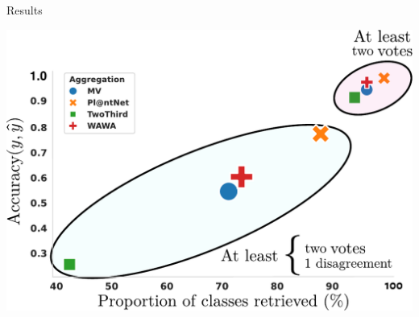 \begin{frame}{Results}{}
    \centering
\begin{center}
\includegraphics[width=\textwidth]{./images/both_accuracies.pdf}
\end{center}

\end{frame}

